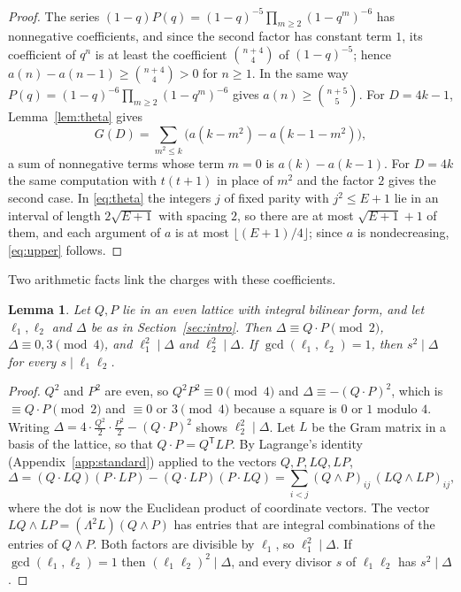 \documentclass[11pt]{amsart}
\newtheorem{lemma}[theorem]{Lemma}
\theoremstyle{definition}
\begin{document}
\begin{proof}
The series $(1-q)P(q)=(1-q)^{-5}\prod_{m\ge2}(1-q^m)^{-6}$ has nonnegative coefficients, and since the second factor has constant term $1$, its coefficient of $q^n$ is at least the coefficient $\binom{n+4}{4}$ of $(1-q)^{-5}$; hence $a(n)-a(n-1)\ge\binom{n+4}4>0$ for $n\ge1$. In the same way $P(q)=(1-q)^{-6}\prod_{m\ge2}(1-q^m)^{-6}$ gives $a(n)\ge\binom{n+5}5$. For $D=4k-1$, Lemma~\ref{lem:theta} gives
\[
G(D)=\sum_{m^2\le k}\bigl(a(k-m^2)-a(k-1-m^2)\bigr),
\]
a sum of nonnegative terms whose term $m=0$ is $a(k)-a(k-1)$. For $D=4k$ the same computation with $t(t+1)$ in place of $m^2$ and the factor $2$ gives the second case. In \eqref{eq:theta} the integers $j$ of fixed parity with $j^2\le E+1$ lie in an interval of length $2\sqrt{E+1}$ with spacing $2$, so there are at most $\sqrt{E+1}+1$ of them, and each argument of $a$ is at most $\lfloor(E+1)/4\rfloor$; since $a$ is nondecreasing, \eqref{eq:upper} follows.
\end{proof}

Two arithmetic facts link the charges with these coefficients.

\begin{lemma}\label{lem:arith}
Let $Q,P$ lie in an even lattice with integral bilinear form, and let $\ell_1,\ell_2$ and $\Delta$ be as in Section~\ref{sec:intro}. Then $\Delta\equiv Q\cdot P\pmod 2$, $\Delta\equiv0,3\pmod4$, and $\ell_1^2\mid\Delta$ and $\ell_2^2\mid\Delta$. If $\gcd(\ell_1,\ell_2)=1$, then $s^2\mid\Delta$ for every $s\mid\ell_1\ell_2$.
\end{lemma}

\begin{proof}
$Q^2$ and $P^2$ are even, so $Q^2P^2\equiv0\pmod4$ and $\Delta\equiv-(Q\cdot P)^2$, which is $\equiv Q\cdot P\pmod2$ and $\equiv0$ or $3\pmod4$ because a square is $0$ or $1$ modulo $4$. Writing $\Delta=4\cdot\frac{Q^2}2\cdot\frac{P^2}2-(Q\cdot P)^2$ shows $\ell_2^2\mid\Delta$. Let $L$ be the Gram matrix in a basis of the lattice, so that $Q\cdot P=Q^{\mathsf T}LP$. By Lagrange's identity (Appendix~\ref{app:standard}) applied to the vectors $Q,P,LQ,LP$,
\[
\Delta=(Q\cdot LQ)(P\cdot LP)-(Q\cdot LP)(P\cdot LQ)=\sum_{i<j}(Q\wedge P)_{ij}\,(LQ\wedge LP)_{ij},
\]
where the dot is now the Euclidean product of coordinate vectors. The vector $LQ\wedge LP=(\Lambda^2L)(Q\wedge P)$ has entries that are integral combinations of the entries of $Q\wedge P$. Both factors are divisible by $\ell_1$, so $\ell_1^2\mid\Delta$. If $\gcd(\ell_1,\ell_2)=1$ then $(\ell_1\ell_2)^2\mid\Delta$, and every divisor $s$ of $\ell_1\ell_2$ has $s^2\mid\Delta$.
\end{proof}
\end{document}

